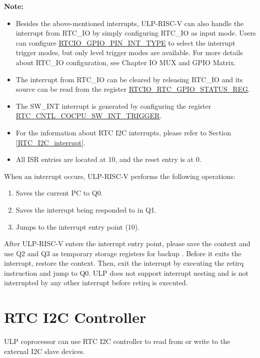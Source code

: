 \documentclass[main\_\_EN.tex]{subfiles}
\begin{document}
\textbf{Note:}
\begin{itemize}
    \item Besides the above-mentioned interrupts, ULP-RISC-V can also handle the interrupt from RTC\_IO by simply configuring RTC\_IO as input mode. Users can configure \hyperref[fielddesc:RTCIOGPIOPINNINTTYPE]{RTCIO\_GPIO\_PIN\_INT\_TYPE} to select the interrupt trigger modes, but only level trigger modes are available. For more details about RTC\_IO configuration, see Chapter IO MUX and GPIO Matrix.
    \item The interrupt from RTC\_IO can be cleared by releasing RTC\_IO and its source can be read from the register \hyperref[regdesc:RTCIORTCGPIOSTATUSREG]{RTCIO\_RTC\_GPIO\_STATUS\_REG}.
    \item The SW\_INT interrupt is generated by configuring the register \hyperref[fielddesc:RTCCNTLCOCPUSWINTTRIGGER]{RTC\_CNTL\_COCPU\_SW\_INT\_TRIGGER}.
    \item For the information about RTC I2C interrupts, please refer to Section \ref{RTC_I2C_interrupt}.
   \item All ISR entries are located at \hexprefix{}10, and the reset entry is at \hexprefix{}0.
\end{itemize}

When an interrupt occurs, ULP-RISC-V performs the following operations:

\begin{enumerate}
    \item Saves the current PC to Q0.
    \item Saves the interrupt being responded to in Q1.
    \item Jumps to the interrupt entry point (\hexprefix{}10).
\end{enumerate}

After ULP-RISC-V enters the interrupt entry point, please save the context and use Q2 and Q3 as temporary storage registers for backup . Before it exits the interrupt, restore the context. Then, exit the interrupt by executing the retirq instruction and jump to Q0. ULP does not support interrupt nesting and is not interrupted by any other interrupt before retirq is executed.

\section{RTC I2C Controller} \label{subsection:RTC_I2C-Controller}

ULP coprocessor can use RTC I2C controller to read from or write to the external I2C slave devices.
\end{document}
